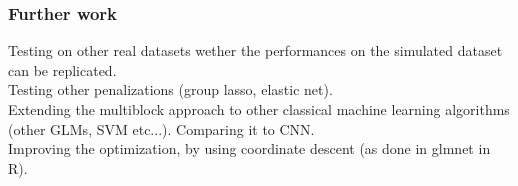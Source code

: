\documentclass{beamer}
\begin{document}


\begin{frame}
    \frametitle{Further work}
    Testing on other real datasets wether the performances on the simulated dataset can be replicated.\\[10 pt]
    Testing other penalizations (group lasso, elastic net).\\[10 pt]
    Extending the multiblock approach to other classical machine learning algorithms (other GLMs, SVM etc...). Comparing it to CNN.\\[10 pt]
    Improving the optimization, by using coordinate descent (as done in glmnet \cite{glmnet} in R).
\end{frame}


\end{document}
